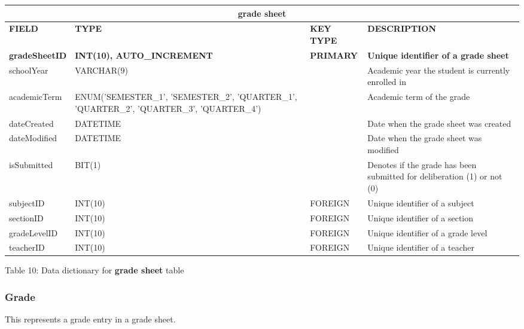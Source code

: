 \documentclass[11pt,a4paper,titlepage]{article}
\begin{document}
\vspace{1cm}
\begin{longtable}{ |p{2.5cm}|p{4.5cm}|p{2.5cm}|p{3cm}|  }
    \hline
    \multicolumn{4}{|c|}{\textbf{grade sheet}} \\
    \hline
    \textbf{FIELD}&\textbf{TYPE}&\textbf{KEY TYPE}&\textbf{DESCRIPTION}\\
    \hline
    \textbf{gradeSheetID}  & \textbf{INT(10), AUTO\_INCREMENT} & \textbf{PRIMARY} & \textbf{Unique identifier of a grade sheet}\\ \hline
    schoolYear   & VARCHAR(9)   & & Academic year the student is currently enrolled in\\ \hline
    academicTerm   & ENUM('SEMESTER\_1', 'SEMESTER\_2', 'QUARTER\_1', 'QUARTER\_2', 'QUARTER\_3', 'QUARTER\_4') &  & Academic term of the grade\\ \hline
    dateCreated   & DATETIME   & & Date when the grade sheet was created\\ \hline
    dateModified  & DATETIME   & & Date when the grade sheet was modified\\ \hline
    isSubmitted   & BIT(1)   & & Denotes if the grade has been submitted for deliberation (1) or not (0)\\ \hline
    subjectID   & INT(10)   & FOREIGN & Unique identifier of a subject\\ \hline
    sectionID   & INT(10)   & FOREIGN & Unique identifier of a section\\ \hline
    gradeLevelID   & INT(10)   & FOREIGN & Unique identifier of a grade level\\ \hline
    teacherID   & INT(10)   & FOREIGN & Unique identifier of a teacher\\ \hline
\end{longtable}
    
\vspace{.5cm}
\begin{center}
    Table 10: Data dictionary for \textbf{grade sheet} table
\end{center}

\newpage

\subsubsection{Grade}

This represents a grade entry in a grade sheet.
\end{document}
